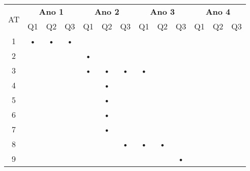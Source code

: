 \documentclass[12pt]{article}
\begin{document}
\begin{table}[htbp]
	\centering
		\begin{tabular}{|c|c|c|c|c|c|c|c|c|c|c|c|c|}
		\hline
		\multirow{2}{*}{AT} & \multicolumn{3}{c|}{\textbf{Ano 1}} & \multicolumn{3}{c|}{\textbf{Ano 2}} & \multicolumn{3}{c|}{\textbf{Ano 3}} & \multicolumn{3}{c|}{\textbf{Ano 4}} \\ \cline{2-13} 
												& Q1         & Q2         & Q3        & Q1         & Q2         & Q3        & Q1         & Q2         & Q3        & Q1         & Q2         & Q3        \\ \hline
		1                   & •          & •          & •         &            &            &           &            &            &           &            &            &           \\ \hline
		2                   &            &            &           & •          &            &           &            &            &           &            &            &           \\ \hline
		3                   &            &            &           & •          & •          & •         & •          &            &           &            &            &           \\ \hline
		4                   &            &            &           &            & •          &           &            &            &           &            &            &           \\ \hline
		5                   &            &            &           &            & •          &           &            &            &           &            &            &           \\ \hline
		6                   &            &            &           &            & •          &           &            &            &           &            &            &           \\ \hline
		7                   &            &            &           &            & •          &           &            &            &           &            &            &           \\ \hline
		8                   &            &            &           &            &            & •         & •          & •          &           &            &            &           \\ \hline
		9                   &            &            &           &            &            &           &            &            & •         &            &            &           \\ \hline

\end{tabular}
\end{table}
\end{document}
